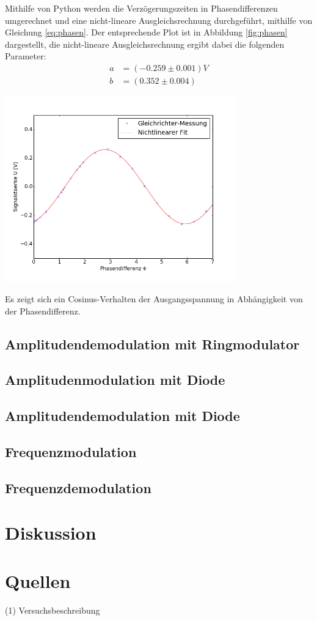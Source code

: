 \documentclass[]{scrartcl}
\begin{document}
Mithilfe von Python werden die Verzögerungszeiten in Phasendifferenzen umgerechnet und eine nicht-lineare Ausgleichsrechnung durchgeführt, mithilfe von Gleichung \ref{eq:phasen}. Der entsprechende Plot ist in Abbildung \ref{fig:phasen} dargestellt, die nicht-lineare Ausgleichsrechnung ergibt dabei die folgenden Parameter:
\begin{align}
a &= (-0.259 \pm 0.001) V \\
b &= ( 0.352 \pm 0.004) 
\end{align}
\begin{center}
	\includegraphics[width=10cm]{images/plotgleich.png}
	\label{fig:phasen}
\end{center}
Es zeigt sich ein Cosinus-Verhalten der Ausgangsspannung in Abhängigkeit von der Phasendifferenz.
\subsection{Amplitudendemodulation mit Ringmodulator}


\subsection{Amplitudenmodulation mit Diode}

\subsection{Amplitudendemodulation mit Diode}

\subsection{Frequenzmodulation}

\subsection{Frequenzdemodulation}

\section{Diskussion}

\section{Quellen}
(1) Versuchsbeschreibung
\end{document}
